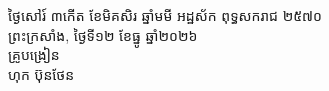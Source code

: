 \documentclass[a4paper,10pt]{article}
\begin{document}
\vspace{6pt}

\begin{flushright}
\begin{minipage}{9.6cm}
\centering
ថ្ងៃសៅរ៍ ៣កើត ខែមិគសិរ ឆ្នាំមមី អដ្ឋស័ក ពុទ្ធសករាជ ២៥៧០\\[2pt]
ព្រះក្រសាំង, ថ្ងៃទី១២ ខែធ្នូ ឆ្នាំ២០២៦\\[4pt]
{\muol គ្រូបង្រៀន}\\[32pt]
\hfill{\muol ហុក ប៊ុនថែន}\hspace*{1.4cm}
\end{minipage}
\end{flushright}
\end{document}
